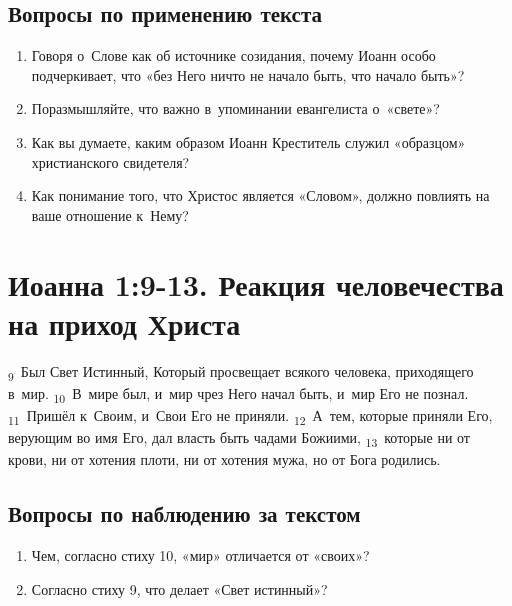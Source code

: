 \documentclass[a4paper,12pt]{article}
\begin{document}
\subsection*{Вопросы по применению текста}

\begin{enumerate}
    \item Говоря о~Слове как об источнике созидания, почему Иоанн особо подчеркивает, что «без Него ничто не начало быть, что начало быть»?
    
    \myline
    
    \myline

    \item Поразмышляйте, что важно в~упоминании евангелиста о~«свете»? 
    
    \myline
    
    \myline
    
    \item Как вы думаете, каким образом Иоанн Креститель служил «образцом» христианского свидетеля? 
    
    \myline
    
    \myline
    
    \item Как понимание того, что Христос является «Словом», должно повлиять на ваше отношение к~Нему?
    
    \myline
    
    \myline

\end{enumerate}



\section{Иоанна 1:9-13. Реакция человечества на приход Христа}

\textsubscript{9}~Был Свет Истинный, Который просвещает всякого человека, приходящего в~мир.
\textsubscript{10}~В~мире был, и~мир чрез Него начал быть, и~мир Его не познал.
\textsubscript{11}~Пришёл к~Своим, и~Свои Его не приняли.
\textsubscript{12}~А~тем, которые приняли Его, верующим во имя Его, дал власть быть чадами Божиими,
\textsubscript{13}~которые ни от крови, ни от хотения плоти, ни от хотения мужа, но от Бога родились.

\subsection*{Вопросы по наблюдению за текстом}
\begin{enumerate}
    \item Чем, согласно стиху 10, «мир» отличается от «своих»? 
    
    \myline
    
    \myline

    \item Согласно стиху 9, что делает «Свет истинный»?

    \myline
    
    \myline   
\end{enumerate}
\end{document}
